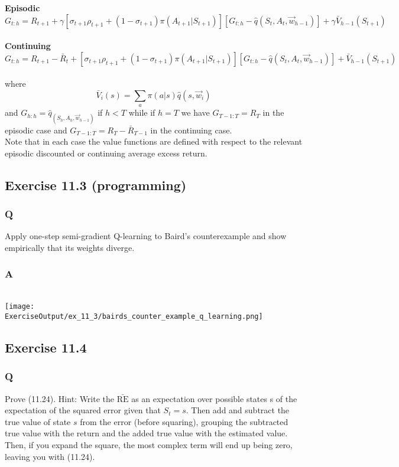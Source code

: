 {\bfseries Episodic}\\
\[
    G_{t:h} = R_{t+1} + \gamma \left[\sigma_{t+1}\rho_{t+1}  + (1-\sigma_{t+1})\pi(A_{t+1} \vert{} S_{t+1})\right]\left[G_{t:h} - \hat{q}(S_t, A_t, \vec{w}_{h-1}) \right] + \gamma \bar{V}_{h-1}(S_{t+1})
\]\\

{\bfseries Continuing}\\
\[
    G_{t:h} = R_{t+1} - \bar{R}_t + \left[\sigma_{t+1}\rho_{t+1}  + (1-\sigma_{t+1})\pi(A_{t+1} \vert{} S_{t+1})\right]\left[G_{t:h} - \hat{q}(S_t, A_t, \vec{w}_{h-1}) \right] + \bar{V}_{h-1}(S_{t+1})
\]\\

where 
\[
    \bar{V}_i(s) = \sum_a \pi(a \vert{} s) \hat{q}(s, \vec{w}_i)
\]
and $G_{h:h} = \hat{q}_(S_h, A_h, \vec{w}_{h-1})$ if $h<T$ while if $h=T$ we have $G_{T-1:T} = R_T$ in the episodic case and $G_{T-1:T} = R_T - \bar{R}_{T-1}$ in the continuing case.\\

Note that in each case the value functions are defined with respect to the relevant episodic discounted or continuing average excess return.

\subsection{Exercise 11.3 (programming)}
\subsubsection*{Q}
Apply one-step semi-gradient Q-learning to Baird’s counterexample and show empirically that its weights diverge.

\subsubsection*{A}
\ProgrammingExercise{}\\

\texttt{[image: \\ExerciseOutput/ex\_11\_3/bairds\_counter\_example\_q\_learning.png]}

\subsection{Exercise 11.4}
\subsubsection*{Q}
Prove (11.24). Hint: Write the $\bar{\mathrm{RE}}$ as an expectation over possible states s of the expectation of the squared error given that $S_t = s$. Then add and subtract the true value of state $s$ from the error (before squaring), grouping the subtracted true value with the return and the added true value with the estimated value. Then, if you expand the square, the most complex term will end up being zero, leaving you with (11.24).

